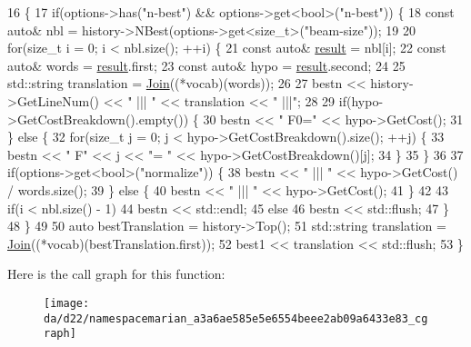 \begin{DoxyCode}
16                              \{
17   \textcolor{keywordflow}{if}(options->has(\textcolor{stringliteral}{"n-best"}) && options->get<\textcolor{keywordtype}{bool}>(\textcolor{stringliteral}{"n-best"})) \{
18     \textcolor{keyword}{const} \textcolor{keyword}{auto}& nbl = history->NBest(options->get<\textcolor{keywordtype}{size\_t}>(\textcolor{stringliteral}{"beam-size"}));
19 
20     \textcolor{keywordflow}{for}(\textcolor{keywordtype}{size\_t} i = 0; i < nbl.size(); ++i) \{
21       \textcolor{keyword}{const} \textcolor{keyword}{auto}& \hyperlink{namespacetest2_a05591d1f1584c3b3d1490fc9ac7519a6}{result} = nbl[i];
22       \textcolor{keyword}{const} \textcolor{keyword}{auto}& words = \hyperlink{namespacetest2_a05591d1f1584c3b3d1490fc9ac7519a6}{result}.first;
23       \textcolor{keyword}{const} \textcolor{keyword}{auto}& hypo = \hyperlink{namespacetest2_a05591d1f1584c3b3d1490fc9ac7519a6}{result}.second;
24 
25       std::string translation = \hyperlink{namespaceamunmt_a24dbaa0ef7dc1f1fcaa131a0f0eacb43}{Join}((*vocab)(words));
26 
27       bestn << history->GetLineNum() << \textcolor{stringliteral}{" ||| "} << translation << \textcolor{stringliteral}{" |||"};
28 
29       \textcolor{keywordflow}{if}(hypo->GetCostBreakdown().empty()) \{
30         bestn << \textcolor{stringliteral}{" F0="} << hypo->GetCost();
31       \} \textcolor{keywordflow}{else} \{
32         \textcolor{keywordflow}{for}(\textcolor{keywordtype}{size\_t} j = 0; j < hypo->GetCostBreakdown().size(); ++j) \{
33           bestn << \textcolor{stringliteral}{" F"} << j << \textcolor{stringliteral}{"= "} << hypo->GetCostBreakdown()[j];
34         \}
35       \}
36 
37       \textcolor{keywordflow}{if}(options->get<\textcolor{keywordtype}{bool}>(\textcolor{stringliteral}{"normalize"})) \{
38         bestn << \textcolor{stringliteral}{" ||| "} << hypo->GetCost() / words.size();
39       \} \textcolor{keywordflow}{else} \{
40         bestn << \textcolor{stringliteral}{" ||| "} << hypo->GetCost();
41       \}
42 
43       \textcolor{keywordflow}{if}(i < nbl.size() - 1)
44         bestn << std::endl;
45       \textcolor{keywordflow}{else}
46         bestn << std::flush;
47     \}
48   \}
49 
50   \textcolor{keyword}{auto} bestTranslation = history->Top();
51   std::string translation = \hyperlink{namespaceamunmt_a24dbaa0ef7dc1f1fcaa131a0f0eacb43}{Join}((*vocab)(bestTranslation.first));
52   best1 << translation << std::flush;
53 \}
\end{DoxyCode}


Here is the call graph for this function\+:
\nopagebreak
\begin{figure}[H]
\begin{center}
\leavevmode
\texttt{[image: da/d22/namespacemarian\_a3a6ae585e5e6554beee2ab09a6433e83\_cgraph]}
\end{center}
\end{figure}




